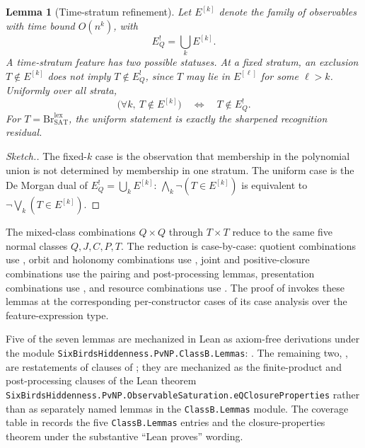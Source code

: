 \documentclass[11pt]{article}
\newcommand{\EQbang}{E^{!}_{Q}}
\newtheorem{lemma}[theorem]{Lemma}
\theoremstyle{definition}
\begin{document}
\begin{lemma}[Time-stratum refinement]
\label{lem:pvnp:time-stratum}
Let \(E^{[k]}\) denote the family of observables with time bound
\(O(n^k)\), with
\[
  \EQbang=\bigcup_k E^{[k]} .
\]
A time-stratum feature has two possible statuses.  At a fixed
stratum, an exclusion \(T\notin E^{[k]}\) does not imply
\(T\notin\EQbang\), since \(T\) may lie in \(E^{[\ell]}\) for some
\(\ell>k\).  Uniformly over all strata,
\[
  \bigl(\forall k,\ T\notin E^{[k]}\bigr)
  \quad\Longleftrightarrow\quad
  T\notin\EQbang .
\]
For \(T=\mathrm{Br}^{\mathrm{lex}}_{\mathrm{SAT}}\), the uniform
statement is exactly the sharpened recognition residual.
\end{lemma}

\begin{proof}[Sketch.]
The fixed-\(k\) case is the observation that membership in the
polynomial union is not determined by membership in one stratum.  The
uniform case is the De Morgan dual of
\(\EQbang=\bigcup_k E^{[k]}\):
\(\bigwedge_k \neg(T\in E^{[k]})\) is equivalent to
\(\neg\bigvee_k(T\in E^{[k]})\).
\end{proof}

The mixed-class combinations \(Q\times Q\) through \(T\times T\)
reduce to the same five normal classes \(Q,J,C,P,T\).  The reduction is
case-by-case: quotient combinations use
, orbit and holonomy combinations
use , joint
and positive-closure combinations use the pairing and post-processing
lemmas, presentation combinations use
, and resource combinations use
.  The proof of
 invokes these lemmas at the
corresponding per-constructor cases of its case analysis over the
feature-expression type.

Five of the seven lemmas are mechanized in Lean as axiom-free
derivations under the module
\texttt{SixBirdsHiddenness.PvNP.ClassB.Lemmas}:
.
The remaining two,
,
are restatements of clauses of
; they are mechanized as the
finite-product and post-processing clauses of the Lean theorem
\texttt{SixBirdsHiddenness.PvNP.ObservableSaturation.eQClosureProperties}
rather than as separately named lemmas in the \texttt{ClassB.Lemmas}
module.  The coverage table in  records the
five \texttt{ClassB.Lemmas} entries and the closure-properties theorem
under the substantive ``Lean proves'' wording.
 
\clearpage


\end{document}

